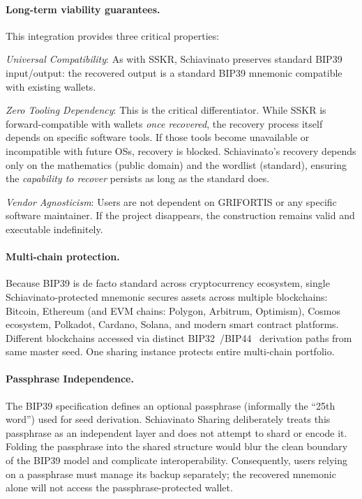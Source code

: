 \documentclass[11pt]{article}
\begin{document}
\paragraph{Long-term viability guarantees.} This integration provides three critical properties:

\textit{Universal Compatibility}: As with SSKR, Schiavinato preserves standard BIP39 input/output: the recovered output is a standard BIP39 mnemonic compatible with existing wallets.

\textit{Zero Tooling Dependency}: This is the critical differentiator. While SSKR is forward-compatible with wallets \textit{once recovered}, the recovery process itself depends on specific software tools. If those tools become unavailable or incompatible with future OSs, recovery is blocked. Schiavinato's recovery depends only on the mathematics (public domain) and the wordlist (standard), ensuring the \textit{capability to recover} persists as long as the standard does.

\textit{Vendor Agnosticism}: Users are not dependent on GRIFORTIS or any specific software maintainer. If the project disappears, the construction remains valid and executable indefinitely.

\paragraph{Multi-chain protection.} Because BIP39 is de facto standard across cryptocurrency ecosystem, single Schiavinato-protected mnemonic secures assets across multiple blockchains: Bitcoin, Ethereum (and EVM chains: Polygon, Arbitrum, Optimism), Cosmos ecosystem, Polkadot, Cardano, Solana, and modern smart contract platforms. Different blockchains accessed via distinct BIP32~\cite{bip32}/BIP44~\cite{bip44} derivation paths from same master seed. One sharing instance protects entire multi-chain portfolio.

\paragraph{Passphrase Independence.} The BIP39 specification defines an optional passphrase (informally the ``25th word'') used for seed derivation. Schiavinato Sharing deliberately treats this passphrase as an independent layer and does not attempt to shard or encode it. Folding the passphrase into the shared structure would blur the clean boundary of the BIP39 model and complicate interoperability. Consequently, users relying on a passphrase must manage its backup separately; the recovered mnemonic alone will not access the passphrase-protected wallet.
\end{document}
